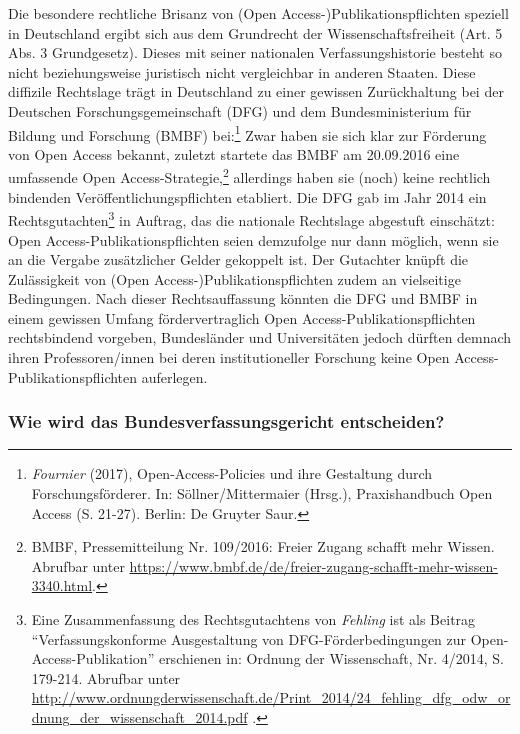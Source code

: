 \documentclass[a4paper,
fontsize=11pt,
oneside,
numbers=noperiodatend,
parskip=half-,
bibliography=totoc,
final
]{scrartcl}
\begin{document}
Die besondere rechtliche Brisanz von (Open Access-)Publikationspflichten
speziell in Deutschland ergibt sich aus dem Grundrecht der
Wissenschaftsfreiheit (Art. 5 Abs. 3 Grundgesetz). Dieses mit seiner
nationalen Verfassungshistorie besteht so nicht beziehungsweise
juristisch nicht vergleichbar in anderen Staaten. Diese diffizile
Rechtslage trägt in Deutschland zu einer gewissen Zurückhaltung bei der
Deutschen Forschungsgemeinschaft (DFG) und dem Bundesministerium für
Bildung und Forschung (BMBF) bei:\footnote{\emph{Fournier} (2017),
  Open-Access-Policies und ihre Gestaltung durch Forschungsförderer. In:
  Söllner/Mittermaier (Hrsg.), Praxishandbuch Open Access (S. 21-27).
  Berlin: De Gruyter Saur.} Zwar haben sie sich klar zur Förderung von
Open Access bekannt, zuletzt startete das BMBF am 20.09.2016 eine
umfassende Open Access-Strategie,\footnote{BMBF, Pressemitteilung Nr.
  109/2016: Freier Zugang schafft mehr Wissen. Abrufbar unter
  \url{https://www.bmbf.de/de/freier-zugang-schafft-mehr-wissen-3340.html}.}
allerdings haben sie (noch) keine rechtlich bindenden
Veröffentlichungspflichten etabliert. Die DFG gab im Jahr 2014 ein
Rechtsgutachten\footnote{Eine Zusammenfassung des Rechtsgutachtens von
  \emph{Fehling} ist als Beitrag \enquote{Verfassungskonforme
  Ausgestaltung von DFG-Förderbedingungen zur Open-Access-Pub\-li\-ka\-ti\-on}
  erschienen in: Ordnung der Wissenschaft, Nr. 4/2014, S. 179-214.
  Abrufbar unter
  \url{http://www.ordnungderwissenschaft.de/Print_2014/24_fehling_dfg_odw_ordnung_der_wissenschaft_2014.pdf}
  .} in Auftrag, das die nationale Rechtslage abgestuft einschätzt: Open
Access-Publikationspflichten seien demzufolge nur dann möglich, wenn sie
an die Vergabe zusätzlicher Gelder gekoppelt ist. Der Gutachter knüpft
die Zulässigkeit von (Open Access-)Publikationspflichten zudem an
vielseitige Bedingungen. Nach dieser Rechtsauffassung könnten die DFG
und BMBF in einem gewissen Umfang fördervertraglich Open
Access-Publikationspflichten rechtsbindend vorgeben, Bundesländer und
Universitäten jedoch dürften demnach ihren Professoren/innen bei deren
institutioneller Forschung keine Open Access-Publikationspflichten
auferlegen.

\hypertarget{wie-wird-das-bundesverfassungsgericht-entscheiden}{%
\subsubsection{Wie wird das Bundesverfassungsgericht
entscheiden?}\label{wie-wird-das-bundesverfassungsgericht-entscheiden}}
\end{document}
